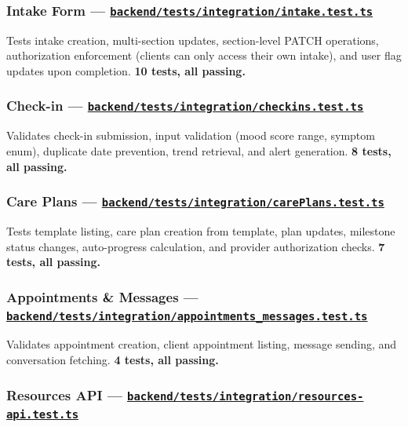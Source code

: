 \documentclass[12pt,letterpaper]{article}
\newcommand{\ghrepo}{https://github.com/omniV1/lunaraCare}
\begin{document}
\subsubsection{Intake Form --- \href{\ghrepo/blob/main/backend/tests/integration/intake.test.ts}{\texttt{backend/tests/integration/intake.test.ts}}}

Tests intake creation, multi-section updates, section-level PATCH operations, authorization enforcement (clients can only access their own intake), and user flag updates upon completion. \textbf{10 tests, all passing.}

\subsubsection{Check-in --- \href{\ghrepo/blob/main/backend/tests/integration/checkins.test.ts}{\texttt{backend/tests/integration/checkins.test.ts}}}

Validates check-in submission, input validation (mood score range, symptom enum), duplicate date prevention, trend retrieval, and alert generation. \textbf{8 tests, all passing.}

\subsubsection{Care Plans --- \href{\ghrepo/blob/main/backend/tests/integration/carePlans.test.ts}{\texttt{backend/tests/integration/carePlans.test.ts}}}

Tests template listing, care plan creation from template, plan updates, milestone status changes, auto-progress calculation, and provider authorization checks. \textbf{7 tests, all passing.}

\subsubsection{Appointments \& Messages --- \href{\ghrepo/blob/main/backend/tests/integration/appointments_messages.test.ts}{\texttt{backend/tests/integration/appointments\_messages.test.ts}}}

Validates appointment creation, client appointment listing, message sending, and conversation fetching. \textbf{4 tests, all passing.}

\subsubsection{Resources API --- \href{\ghrepo/blob/main/backend/tests/integration/resources-api.test.ts}{\texttt{backend/tests/integration/resources-api.test.ts}}}
\end{document}
